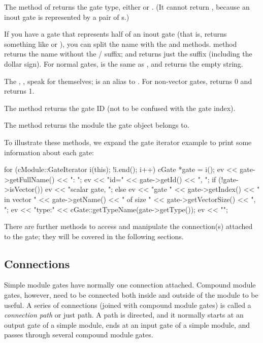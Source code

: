 The  method of  returns the gate type,
either  or . (It cannot return
, because an inout gate is represented by a pair
of s.)

If you have a gate that represents half of an inout gate (that is,
 returns something like  or ), you
can split the name with the  and
 methods.  method returns the
name without the / suffix; and 
returns just the suffix (including the dollar sign). For normal gates,
 is the same as , and
 returns the empty string.

The , ,  speak
for themselves;  is an alias to . For
non-vector gates,  returns 0 and 
returns 1.

The  method returns the gate ID (not to be confused
with the gate index).

The  method returns the module the gate object
belongs to.

To illustrate these methods, we expand the gate iterator example
to print some information about each gate:

\begin{cpp}
for (cModule::GateIterator i(this); !i.end(); i++) {
    cGate *gate = i();
    ev << gate->getFullName() << ": ";
    ev << "id=" << gate->getId() << ", ";
    if (!gate->isVector())
        ev << "scalar gate, ";
    else
        ev << "gate " << gate->getIndex()
           << " in vector " << gate->getName()
           << " of size " << gate->getVectorSize() << ", ";
    ev << "type:" << cGate::getTypeName(gate->getType());
    ev << "\n";
}
\end{cpp}

There are further  methods to access and manipulate
the connection(s) attached to the gate; they will be covered in the
following sections.


\subsection{Connections}
\label{sec:simple-modules:connections}

Simple module gates have normally one connection attached. Compound module
gates, however, need to be connected both inside and outside of the
module to be useful. A series of connections (joined with compound
module gates) is called a \textit{connection path} or just path.
A path is directed, and it normally starts at an output gate of
a simple module, ends at an input gate of a simple module,
and passes through several compound module gates.

